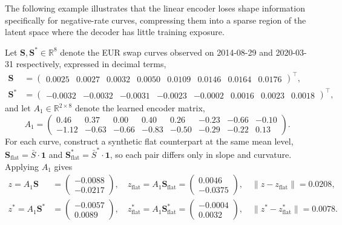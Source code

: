\begin{example}
The following example illustrates that the linear encoder loses shape information 
specifically for negative-rate curves, compressing them into a sparse region of 
the latent space where the decoder has little training exposure.

Let $\mathbf{S}, \mathbf{S}^* \in \mathbb{R}^8$ denote the EUR swap curves 
observed on 2014-08-29 and 2020-03-31 respectively, expressed in decimal terms,
\begin{align*}
\mathbf{S} &= \begin{pmatrix} 0.0025 & 0.0027 & 0.0032 & 0.0050 & 0.0109 & 
0.0146 & 0.0164 & 0.0176 \end{pmatrix}^\top, \\
\mathbf{S}^* &= \begin{pmatrix} -0.0032 & -0.0032 & -0.0031 & -0.0023 & -0.0002 
& 0.0016 & 0.0023 & 0.0018 \end{pmatrix}^\top,
\end{align*}
and let $A_1 \in \mathbb{R}^{2\times 8}$ denote the learned encoder matrix,
$$A_1 = \begin{pmatrix} 0.46 & 0.37 & 0.00 & 0.40 & 0.26 & -0.23 & -0.66 & -0.10 \\ 
-1.12 & -0.63 & -0.66 & -0.83 & -0.50 & -0.29 & -0.22 & 0.13 \end{pmatrix}.$$
For each curve, construct a synthetic flat counterpart at the same mean level,
$\mathbf{S}_{\text{flat}} = \bar{S}\cdot\mathbf{1}$ and 
$\mathbf{S}^*_{\text{flat}} = \bar{S}^*\cdot\mathbf{1}$, so each pair differs 
only in slope and curvature. Applying $A_1$ gives
\begin{align*}
z = A_1\mathbf{S} &= \begin{pmatrix} -0.0088 \\ -0.0217 \end{pmatrix}, \quad
z_{\text{flat}} = A_1\mathbf{S}_{\text{flat}} = \begin{pmatrix} 0.0046 \\ 
-0.0375 \end{pmatrix}, \quad \|z - z_{\text{flat}}\| = 0.0208, \\
z^* = A_1\mathbf{S}^* &= \begin{pmatrix} -0.0057 \\ 0.0089 \end{pmatrix}, \quad
z^*_{\text{flat}} = A_1\mathbf{S}^*_{\text{flat}} = \begin{pmatrix} -0.0004 \\ 
0.0032 \end{pmatrix}, \quad \|z^* - z^*_{\text{flat}}\| = 0.0078.
\end{align*}


\end{example}
